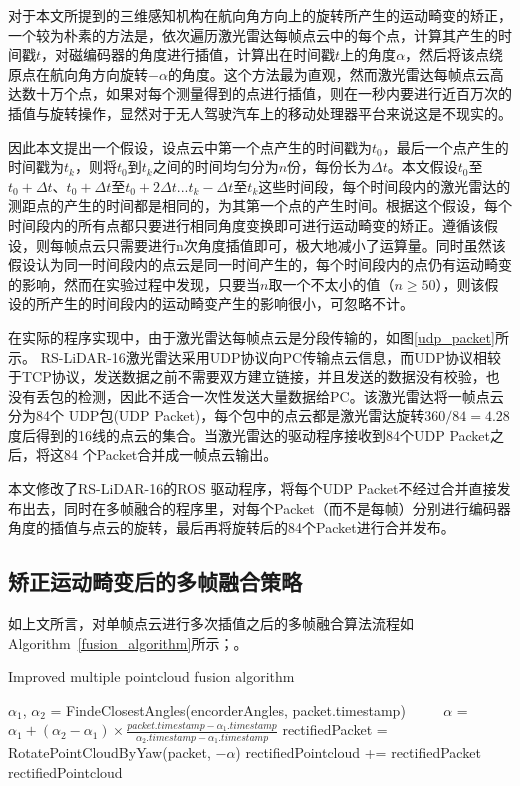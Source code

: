 对于本文所提到的三维感知机构在航向角方向上的旋转所产生的运动畸变的矫正，一个较为朴素的方法是，依次遍历激光雷达每帧点云中的每个点，计算其产生的时间戳$t$，对磁编码器的角度进行插值，计算出在时间戳$t$上的角度$\alpha$，然后将该点绕原点在航向角方向旋转$-\alpha$的角度。这个方法最为直观，然而激光雷达每帧点云高达数十万个点，如果对每个测量得到的点进行插值，则在一秒内要进行近百万次的插值与旋转操作，显然对于无人驾驶汽车上的移动处理器平台来说这是不现实的。

因此本文提出一个假设，设点云中第一个点产生的时间戳为$t_0$，最后一个点产生的时间戳为$t_k$，则将$t_0$到$t_k$之间的时间均匀分为$n$份，每份长为$\Delta t$。本文假设$t_0$至$t_0+\Delta t$、$t_0+\Delta t$至$t_0+2\Delta t$...$t_k-\Delta t$至$t_k$这些时间段，每个时间段内的激光雷达的测距点的产生的时间都是相同的，为其第一个点的产生时间。根据这个假设，每个时间段内的所有点都只要进行相同角度变换即可进行运动畸变的矫正。遵循该假设，则每帧点云只需要进行n次角度插值即可，极大地减小了运算量。同时虽然该假设认为同一时间段内的点云是同一时间产生的，每个时间段内的点仍有运动畸变的影响，然而在实验过程中发现，只要当$n$取一个不太小的值（$n\geq 50$），则该假设的所产生的时间段内的运动畸变产生的影响很小，可忽略不计。

在实际的程序实现中，由于激光雷达每帧点云是分段传输的，如图\ref{udp_packet}所示。
RS-LiDAR-16激光雷达采用UDP协议向PC传输点云信息，而UDP协议相较于TCP协议，发送数据之前不需要双方建立链接，并且发送的数据没有校验，也没有丢包的检测，因此不适合一次性发送大量数据给PC。该激光雷达将一帧点云分为84个 UDP包(UDP Packet)，每个包中的点云都是激光雷达旋转$360 / 84 = 4.28$度后得到的16线的点云的集合。当激光雷达的驱动程序接收到84个UDP Packet之后，将这84 个Packet合并成一帧点云输出。

本文修改了RS-LiDAR-16的ROS 驱动程序，将每个UDP Packet不经过合并直接发布出去，同时在多帧融合的程序里，对每个Packet（而不是每帧）分别进行编码器角度的插值与点云的旋转，最后再将旋转后的84个Packet进行合并发布。

\subsection{矫正运动畸变后的多帧融合策略}

如上文所言，对单帧点云进行多次插值之后的多帧融合算法流程如Algorithm~\ref{fusion_algorithm}所示；。

\begin{algorithm}[t]
    \caption{Improved multiple pointcloud fusion algorithm} %
    \label{fusion_algorithm}
    \begin{algorithmic}[1]
        \State $\alpha_1$, $\alpha_2$ = FindeClosestAngles(encorderAngles, packet.timestamp)
    　　 \State $\alpha$ = $\alpha_1+(\alpha_2-\alpha_1)\times \frac{packet.timestamp - \alpha_1.timestamp}{\alpha_2.timestamp - \alpha_1.timestamp}$
        \State rectifiedPacket = RotatePointCloudByYaw(packet, $-\alpha$)
        \State rectifiedPointcloud += rectifiedPacket
    \EndFor
    \State \Return rectifiedPointcloud
    \end{algorithmic}
\end{algorithm}

